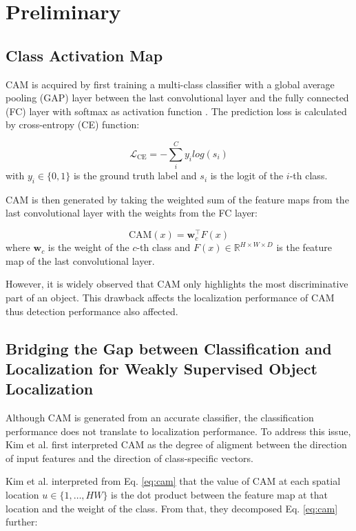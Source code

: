 \documentclass[conference]{IEEEtran}
\begin{document}
\section{Preliminary}
\subsection{Class Activation Map}
CAM is acquired by first training a multi-class classifier with a global average pooling (GAP) layer between the last convolutional layer and the fully connected (FC) layer with softmax as activation function \cite{zhou2015cnnlocalization}. The prediction loss is calculated by cross-entropy (CE) function:

\begin{equation}\label{eq:ce_loss}
    \mathcal{L}_{\text{CE}}=-\sum_{i}^{C}{y_i log(s_i)}
\end{equation}
with $y_i \in \{0, 1\}$ is the ground truth label and $s_i$ is the logit of the $i$-th class.

CAM is then generated by taking the weighted sum of the feature maps from the last convolutional layer with the weights from the FC layer:

\begin{equation}\label{eq:cam}
    \text{CAM}(x)=\mathbf{w}_c^{\boldsymbol{\top}} F(x)
\end{equation}
where $\mathbf{w}_c$ is the weight of the $c$-th class and $F(x) \in \mathbb{R}^{H \times W \times D}$ is the feature map of the last convolutional layer.

However, it is widely observed that CAM only highlights the most discriminative part of an object. This drawback affects the localization performance of CAM thus detection performance also affected.


\subsection{Bridging the Gap between Classification and Localization for Weakly Supervised Object Localization}
Although CAM is generated from an accurate classifier, the classification performance does not translate to localization performance. To address this issue, Kim et al. \cite{kim2022bridging} first interpreted CAM as the degree of aligment between the direction of input features and the direction of class-specific vectors.

Kim et al. interpreted from Eq. \ref{eq:cam} that the value of CAM at each spatial location $u \in \{1, \dots, HW\}$ is the dot product between the feature map at that location and the weight of the class. From that, they decomposed Eq. \ref{eq:cam} further:
\end{document}
